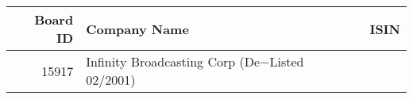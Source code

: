 

\begin{longtable}{ r l l }\hline\hline
   Board ID &    Company Name &    ISIN\\ 
\hline\endhead
   15917 &    Infinity Broadcasting Corp (De$-$Listed 02/2001) &     \\ 
\hline\hline\end{longtable}

